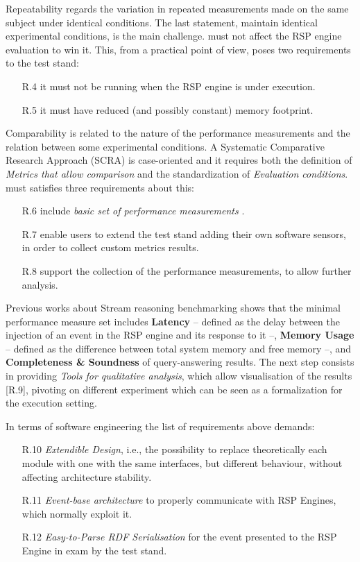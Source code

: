 Repeatability regards the variation in repeated measurements made on the same subject under identical conditions. The last statement, maintain identical experimental conditions, is the main challenge. \name must not affect the RSP engine evaluation to win it. This, from a practical point of view, poses two requirements to the test stand:
\begin{enumerate}
\item[R.4] it must not be running when the RSP engine is under execution. %
\item[R.5] it must have reduced (and possibly constant) memory footprint. %
\end{enumerate}

Comparability is related to the nature of the performance measurements and the relation between some experimental conditions. A Systematic Comparative Research Approach (SCRA) is case-oriented and it requires both the definition of \textit{Metrics that allow comparison} and the standardization of \textit{Evaluation conditions}.  \name must satisfies three requirements about this:
\begin{enumerate}
\item[R.6] include \textit{basic set of performance measurements} \cite{DBLP:conf/esws/ScharrenbachUMVB13}.
\item[R.7] enable users to extend the test stand adding their own software sensors, in order to collect custom metrics results.
\item[R.8] support the collection of the performance measurements, to allow further analysis.
\end{enumerate}

Previous works about Stream reasoning benchmarking shows that the minimal performance measure set includes \textbf{Latency} -- defined as the delay between the injection of an event in the RSP engine and its response to it --, \textbf{Memory Usage} -- defined as the difference between total system memory and free memory --, and \textbf{Completeness \& Soundness} of query-answering results. 
The next step consists in providing \textit{Tools for qualitative analysis}, which allow visualisation of the results [R.9], pivoting on different experiment which can be seen as a formalization for the execution setting.

In terms of software engineering the list of requirements above demands: \begin{enumerate}
\item[R.10] \textit{Extendible Design}, i.e.,  the possibility to replace theoretically each module with one with the same interfaces, but different behaviour, without affecting architecture stability.
\item[R.11] \textit{Event-base architecture} to properly communicate with  RSP Engines, which normally exploit it.
\item[R.12] \textit{Easy-to-Parse RDF Serialisation} for the event presented to the RSP Engine in exam by the test stand.
\end{enumerate}

